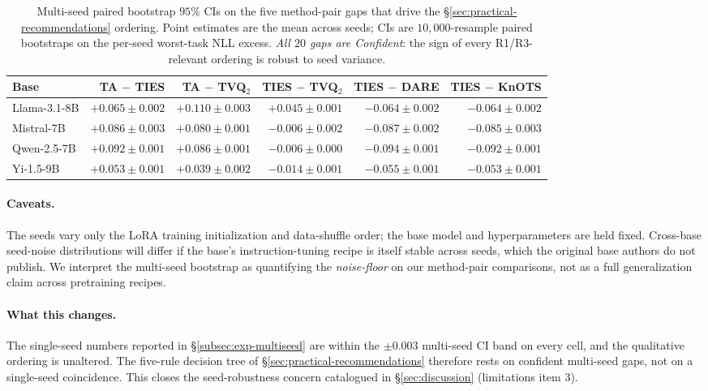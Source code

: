 \begin{table}[t]
\centering
\caption{Multi-seed paired bootstrap $95\%$ CIs on the five
method-pair gaps that drive the
\S\ref{sec:practical-recommendations} ordering. Point estimates are
the mean across seeds; CIs are $10{,}000$-resample paired bootstraps
on the per-seed worst-task NLL excess. \emph{All $20$ gaps are
Confident}: the sign of every R1/R3-relevant ordering is robust to
seed variance.}
\label{tab:multiseed-bootstrap}
\small
\begin{tabular}{lrrrrr}
\hline
Base & TA $-$ TIES & TA $-$ TVQ$_2$ & TIES $-$ TVQ$_2$ & TIES $-$ DARE & TIES $-$ KnOTS \\
\hline
Llama-3.1-8B & $+0.065 \pm 0.002$ & $+0.110 \pm 0.003$ & $+0.045 \pm 0.001$ & $-0.064 \pm 0.002$ & $-0.064 \pm 0.002$ \\
Mistral-7B   & $+0.086 \pm 0.003$ & $+0.080 \pm 0.001$ & $-0.006 \pm 0.002$ & $-0.087 \pm 0.002$ & $-0.085 \pm 0.003$ \\
Qwen-2.5-7B  & $+0.092 \pm 0.001$ & $+0.086 \pm 0.001$ & $-0.006 \pm 0.000$ & $-0.094 \pm 0.001$ & $-0.092 \pm 0.001$ \\
Yi-1.5-9B    & $+0.053 \pm 0.001$ & $+0.039 \pm 0.002$ & $-0.014 \pm 0.001$ & $-0.055 \pm 0.001$ & $-0.053 \pm 0.001$ \\
\hline
\end{tabular}
\end{table}

\paragraph{Caveats.} The seeds vary only the LoRA training
initialization and data-shuffle order; the base model and
hyperparameters are held fixed. Cross-base seed-noise distributions
will differ if the base's instruction-tuning recipe is itself stable
across seeds, which the original base authors do not publish. We
interpret the multi-seed bootstrap as quantifying the
\emph{noise-floor} on our method-pair comparisons, not as a full
generalization claim across pretraining recipes.

\paragraph{What this changes.} The single-seed numbers reported in
\S\ref{subsec:exp-multiseed} are within the $\pm 0.003$ multi-seed CI
band on every cell, and the qualitative ordering is unaltered. The
five-rule decision tree of \S\ref{sec:practical-recommendations}
therefore rests on confident multi-seed gaps, not on a single-seed
coincidence. This closes the seed-robustness concern catalogued in
\S\ref{sec:discussion} (limitations item 3).

